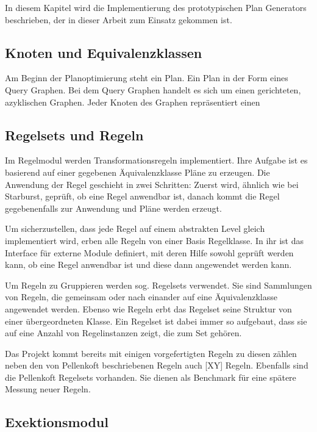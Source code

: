 In diesem Kapitel wird die Implementierung des prototypischen Plan Generators beschrieben, der in dieser Arbeit zum Einsatz gekommen ist.

\subsection{Knoten und Equivalenzklassen}

Am Beginn der Planoptimierung steht ein Plan. Ein Plan in der Form eines Query Graphen. Bei dem Query Graphen handelt es sich um einen gerichteten, azyklischen Graphen. Jeder Knoten des Graphen repräsentiert einen 



\subsection{Regelsets und Regeln}

Im Regelmodul werden Transformationsregeln implementiert. Ihre Aufgabe ist es basierend auf einer gegebenen Äquivalenzklasse Pläne zu erzeugen. Die Anwendung der Regel geschieht in zwei Schritten: Zuerst  wird, ähnlich wie bei Starburst, geprüft, ob eine Regel anwendbar ist, danach kommt die Regel gegebenenfalls zur Anwendung und Pläne werden erzeugt.

Um sicherzustellen, dass jede Regel auf einem abstrakten Level gleich implementiert wird, erben alle Regeln von einer Basis Regelklasse. In ihr ist das Interface für externe Module definiert, mit deren Hilfe sowohl geprüft werden kann, ob eine Regel anwendbar ist und diese dann angewendet werden kann.

Um Regeln zu Gruppieren werden sog. Regelsets verwendet. Sie sind Sammlungen von Regeln, die gemeinsam oder nach einander auf eine Äquivalenzklasse angewendet werden. Ebenso wie Regeln erbt das Regelset seine Struktur von einer übergeordneten Klasse. Ein Regelset ist dabei immer so aufgebaut, dass sie auf eine Anzahl von Regelinstanzen zeigt, die zum Set gehören.

Das Projekt kommt bereits mit einigen vorgefertigten Regeln zu diesen zählen neben den von Pellenkoft \cite{} beschriebenen Regeln auch [XY] Regeln. Ebenfalls sind die Pellenkoft Regelsets vorhanden. Sie dienen als Benchmark für eine spätere Messung neuer Regeln.


\subsection{Exektionsmodul}

